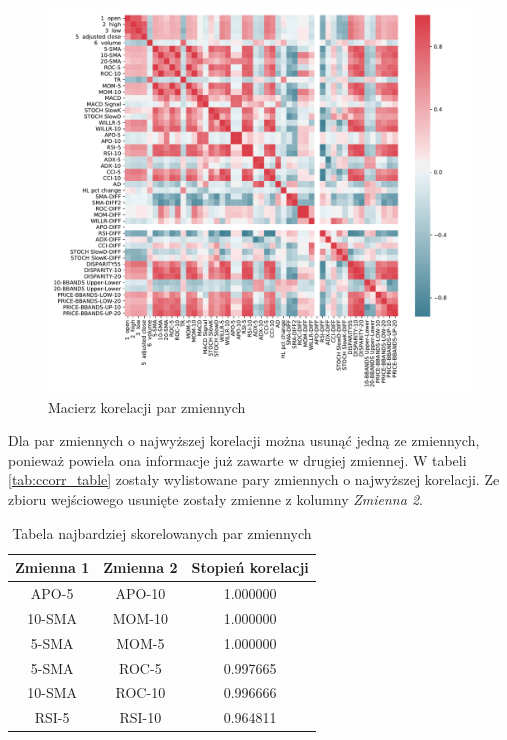 \documentclass[a4paper, twoside, 11pt, openright]{article}
\begin{document}
\begin{figure}[H]
\centering 
\includegraphics[scale=0.6]{img/corr_matrix.pdf}
\caption{Macierz korelacji par zmiennych}
\label{img:correlation}
\end{figure}

Dla par zmiennych o najwyższej korelacji można usunąć jedną ze zmiennych, ponieważ powiela ona informacje już zawarte w drugiej zmiennej.  W tabeli \ref{tab:ccorr_table} zostały wylistowane pary zmiennych o najwyższej korelacji. Ze zbioru wejściowego usunięte zostały zmienne z kolumny \textit{Zmienna 2}.


\begin{table}[H]
\centering
\begin{tabular}{ |c|c|c| } 
 \hline
Zmienna 1 & Zmienna 2 &  Stopień korelacji \\
 \hline
APO-5 & APO-10 &  1.000000 \\
 \hline
10-SMA & MOM-10 &  1.000000 \\
 \hline
5-SMA & MOM-5 &  1.000000 \\
 \hline
5-SMA & ROC-5 &  0.997665 \\
 \hline
10-SMA & ROC-10 &  0.996666 \\
 \hline
RSI-5 & RSI-10 &  0.964811 \\  
 \hline
\end{tabular}
\caption{Tabela najbardziej skorelowanych par zmiennych}
\label{tab:ccorr_table1}
\end{table}
\end{document}
